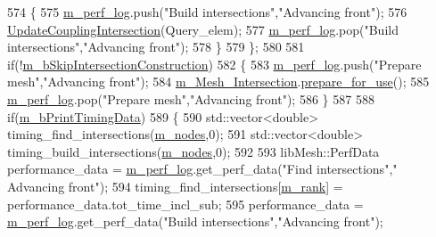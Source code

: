 \begin{DoxyCode}
574             \{
575                 \hyperlink{classcarl_1_1_intersection___search_aebe6210287a36909206b1a59f9cd17e0}{m\_perf\_log}.push(\textcolor{stringliteral}{"Build intersections"},\textcolor{stringliteral}{"Advancing front"});
576                 \hyperlink{classcarl_1_1_intersection___search_a2a8731986e5f6963da7bada4c5eb9031}{UpdateCouplingIntersection}(Query\_elem);
577                 \hyperlink{classcarl_1_1_intersection___search_aebe6210287a36909206b1a59f9cd17e0}{m\_perf\_log}.pop(\textcolor{stringliteral}{"Build intersections"},\textcolor{stringliteral}{"Advancing front"});
578             \}
579         \};
580 
581         \textcolor{keywordflow}{if}(!\hyperlink{classcarl_1_1_intersection___search_aef626956ac007f4c737aba3f2f69f2de}{m\_bSkipIntersectionConstruction})
582         \{
583             \hyperlink{classcarl_1_1_intersection___search_aebe6210287a36909206b1a59f9cd17e0}{m\_perf\_log}.push(\textcolor{stringliteral}{"Prepare mesh"},\textcolor{stringliteral}{"Advancing front"});
584             \hyperlink{classcarl_1_1_intersection___search_a4946b764d66e3f26f323c5d043551c66}{m\_Mesh\_Intersection}.\hyperlink{classcarl_1_1_mesh___intersection_a5078651b6ae4cfdf97e43dfa172094b6}{prepare\_for\_use}();
585             \hyperlink{classcarl_1_1_intersection___search_aebe6210287a36909206b1a59f9cd17e0}{m\_perf\_log}.pop(\textcolor{stringliteral}{"Prepare mesh"},\textcolor{stringliteral}{"Advancing front"});
586         \}
587 
588         \textcolor{keywordflow}{if}(\hyperlink{classcarl_1_1_intersection___search_a01537442f23786cbe1766ac340858020}{m\_bPrintTimingData})
589         \{
590             std::vector<double> timing\_find\_intersections(\hyperlink{classcarl_1_1_intersection___search_adcfd59960cfd05bc63e9bcf5a350a8ae}{m\_nodes},0);
591             std::vector<double> timing\_build\_intersections(\hyperlink{classcarl_1_1_intersection___search_adcfd59960cfd05bc63e9bcf5a350a8ae}{m\_nodes},0);
592 
593             libMesh::PerfData performance\_data = \hyperlink{classcarl_1_1_intersection___search_aebe6210287a36909206b1a59f9cd17e0}{m\_perf\_log}.get\_perf\_data(\textcolor{stringliteral}{"Find intersections"},\textcolor{stringliteral}{"
      Advancing front"});
594             timing\_find\_intersections[\hyperlink{classcarl_1_1_intersection___search_a82564dfb7815673fcb9d9e3eb2d03b97}{m\_rank}] = performance\_data.tot\_time\_incl\_sub;
595             performance\_data = \hyperlink{classcarl_1_1_intersection___search_aebe6210287a36909206b1a59f9cd17e0}{m\_perf\_log}.get\_perf\_data(\textcolor{stringliteral}{"Build intersections"},\textcolor{stringliteral}{"Advancing front"});

\end{DoxyCode}
